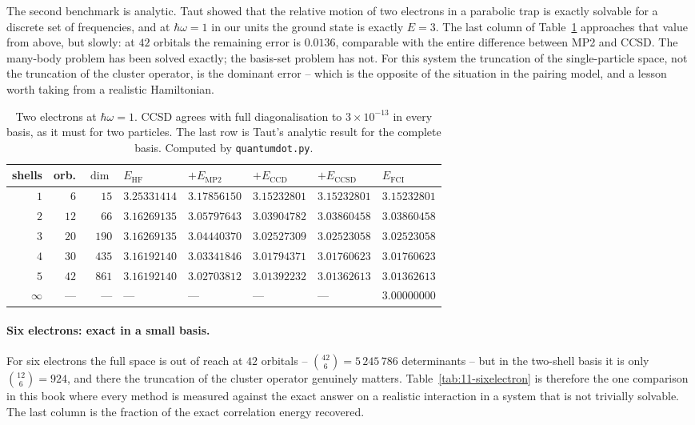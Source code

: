 The second benchmark is analytic.  Taut showed that the relative motion of two
electrons in a parabolic trap is exactly solvable for a discrete set of
frequencies, and at $\hbar\omega=1$ in our units the ground state is exactly
$E=3$.  The last column of Table~\ref{tab:11-twoelectron} approaches that
value from above, but slowly: at $42$ orbitals the remaining error is
$0.0136$, comparable with the entire difference between MP2 and CCSD.  The
many-body problem has been solved exactly; the basis-set problem has not.  For
this system the truncation of the single-particle space, not the truncation of
the cluster operator, is the dominant error -- which is the opposite of the
situation in the pairing model, and a lesson worth taking from a realistic
Hamiltonian.

\begin{table}[h]
\centering
\renewcommand{\arraystretch}{1.25}
\setlength{\tabcolsep}{6pt}
\small
\begin{tabular}{rrrlllll}
\toprule
shells & orb. & $\dim$ & $E_{\mathrm{HF}}$ &
$+E_{\mathrm{MP2}}$ & $+E_{\mathrm{CCD}}$ & $+E_{\mathrm{CCSD}}$ &
$E_{\mathrm{FCI}}$\\
\midrule
$1$ & $6$  & $15$  & $3.25331414$ & $3.17856150$ & $3.15232801$ &
  $3.15232801$ & $3.15232801$\\
$2$ & $12$ & $66$  & $3.16269135$ & $3.05797643$ & $3.03904782$ &
  $3.03860458$ & $3.03860458$\\
$3$ & $20$ & $190$ & $3.16269135$ & $3.04440370$ & $3.02527309$ &
  $3.02523058$ & $3.02523058$\\
$4$ & $30$ & $435$ & $3.16192140$ & $3.03341846$ & $3.01794371$ &
  $3.01760623$ & $3.01760623$\\
$5$ & $42$ & $861$ & $3.16192140$ & $3.02703812$ & $3.01392232$ &
  $3.01362613$ & $3.01362613$\\
\midrule
$\infty$ & --- & --- & --- & --- & --- & --- & $3.00000000$\\
\bottomrule
\end{tabular}
\caption{Two electrons at $\hbar\omega=1$.  CCSD agrees with full
diagonalisation to $3\times10^{-13}$ in every basis, as it must for two
particles.  The last row is Taut's analytic result for the complete basis.
Computed by \texttt{quantumdot.py}.}
\label{tab:11-twoelectron}
\end{table}

\paragraph{Six electrons: exact in a small basis.}
For six electrons the full space is out of reach at $42$ orbitals --
$\binom{42}{6}=5\,245\,786$ determinants -- but in the two-shell basis it is
only $\binom{12}{6}=924$, and there the truncation of the cluster operator
genuinely matters.  Table~\ref{tab:11-sixelectron} is therefore the one
comparison in this book where every method is measured against the exact
answer on a realistic interaction in a system that is not trivially solvable.
The last column is the fraction of the exact correlation energy recovered.

